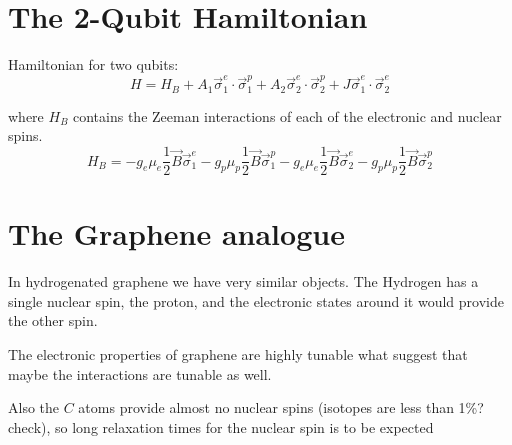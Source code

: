 \section{The 2-Qubit Hamiltonian}
 Hamiltonian for two qubits:
\begin{equation}
  H = H_B +A_1\vec{\sigma}^e_1\cdot\vec{\sigma}^p_1
      +A_2\vec{\sigma}^e_2\cdot\vec{\sigma}^p_2
      +J\vec{\sigma}^e_1\cdot\vec{\sigma}^e_2
\end{equation}

where $H_B$ contains the Zeeman interactions of each of the electronic and nuclear spins.
\begin{equation}
  H_B = -g_e\mu_e\frac{1}{2}\vec{B}\vec{\sigma}^e_1
      -g_p\mu_p\frac{1}{2}\vec{B}\vec{\sigma}^p_1
      -g_e\mu_e\frac{1}{2}\vec{B}\vec{\sigma}^e_2
      -g_p\mu_p\frac{1}{2}\vec{B}\vec{\sigma}^p_2
\end{equation}



\section{The Graphene analogue}
In hydrogenated graphene we have very similar objects. The Hydrogen has a single nuclear spin, the proton, and the electronic states around it would provide the other spin.

The electronic properties of graphene are highly tunable what suggest that maybe the interactions are tunable as well.

Also the $C$ atoms provide almost no nuclear spins (isotopes are less than 1\%? check), so long relaxation times for the nuclear spin is to be expected


